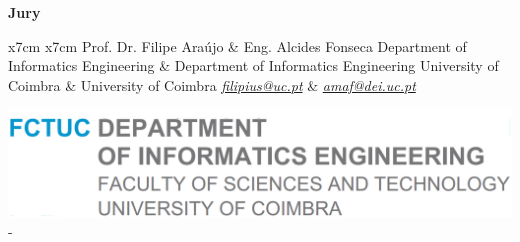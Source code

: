 \begin{center}
 	\vspace{-0.25cm}
 	\Large{\textbf{Jury}}\\[1pc]
 	\begin{table}[h]
 		\begin{center}
 			\setlength{\tabcolsep}{10pt}
 			\begin{tabular}{x{7cm} x{7cm}}
 				\large Prof. Dr. Filipe Araújo & \large Eng. Alcides Fonseca\tabularnewline
 				Department of Informatics Engineering & Department of Informatics Engineering \tabularnewline
 				University of Coimbra & University of Coimbra \tabularnewline
 				\href{mailto:filipius@uc.pt}{\textit{filipius@uc.pt}} & \href{mailto:amaf@dei.uc.pt}{\textit{amaf@dei.uc.pt}}
 			\end{tabular}
 		\end{center}
 	\end{table}
 	
 \end{center}
 
 \vfill
 \noindent\includegraphics[scale=0.25]{Figures/dei}
 -